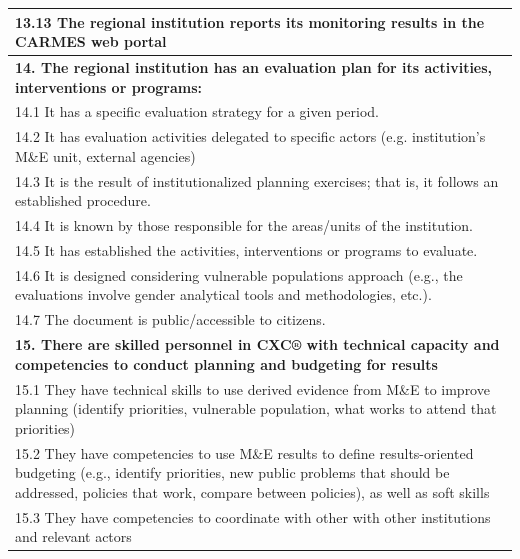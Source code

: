 \documentclass[
  10pt,
]{book}
\begin{document}
\begin{table}
\begin{tabular}[t]{l}
\hline
\hspace{1em}13.13 The regional institution reports its monitoring results in the CARMES web portal\\
\hline
\multicolumn{1}{l}{\textbf{14. The regional institution has an evaluation plan for its activities, interventions or programs:}}\\
\hline
\hspace{1em}14.1 It has a specific evaluation strategy for a given period.\\
\hline
\hspace{1em}14.2 It has evaluation activities delegated to specific actors (e.g. institution's M\&E unit, external agencies)\\
\hline
\hspace{1em}14.3 It is the result of institutionalized planning exercises; that is, it follows an established procedure.\\
\hline
\hspace{1em}14.4 It is known by those responsible for the areas/units of the institution.\\
\hline
\hspace{1em}14.5 It has established the activities, interventions or programs to evaluate.\\
\hline
\hspace{1em}14.6 It is designed considering vulnerable populations approach (e.g., the evaluations involve gender analytical tools and methodologies, etc.).\\
\hline
\hspace{1em}14.7 The document is public/accessible to citizens.\\
\hline
\multicolumn{1}{l}{\textbf{15. There are skilled personnel in CXC® with technical capacity and competencies to conduct planning and budgeting for results}}\\
\hline
\hspace{1em}15.1 They have technical skills to use derived evidence from M\&E to improve planning (identify priorities, vulnerable population, what works to attend that priorities)\\
\hline
\hspace{1em}15.2 They have competencies to use M\&E results to define results-oriented budgeting (e.g., identify priorities, new public problems that should be addressed, policies that work, compare between policies), as well as soft skills\\
\hline
\hspace{1em}15.3 They have competencies to coordinate with other with other institutions and relevant actors\\

\end{tabular}
\end{table}
\end{document}

